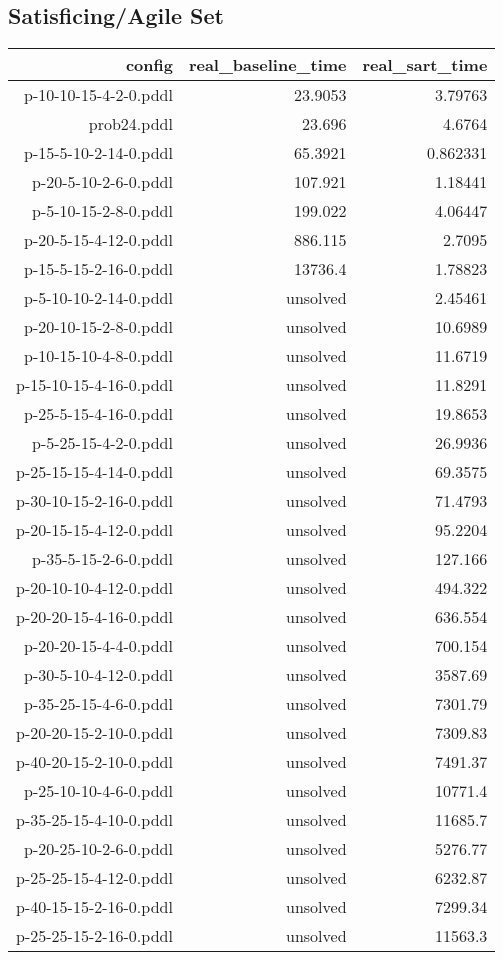 \documentclass{article}
\begin{document}
                    
                    \subsection*{Satisficing/Agile Set}
                    
                            \begin{center}
                            \scriptsize
                            \begin{tabular}{r|r|r}
                            config & real\_baseline\_time & real\_sart\_time\\\midrule
                             p-10-10-15-4-2-0.pddl&23.9053&3.79763\\
 prob24.pddl&23.696&4.6764\\
 p-15-5-10-2-14-0.pddl&65.3921&0.862331\\
 p-20-5-10-2-6-0.pddl&107.921&1.18441\\
 p-5-10-15-2-8-0.pddl&199.022&4.06447\\
 p-20-5-15-4-12-0.pddl&886.115&2.7095\\
 p-15-5-15-2-16-0.pddl&13736.4&1.78823\\
 p-5-10-10-2-14-0.pddl&unsolved&2.45461\\
 p-20-10-15-2-8-0.pddl&unsolved&10.6989\\
 p-10-15-10-4-8-0.pddl&unsolved&11.6719\\
 p-15-10-15-4-16-0.pddl&unsolved&11.8291\\
 p-25-5-15-4-16-0.pddl&unsolved&19.8653\\
 p-5-25-15-4-2-0.pddl&unsolved&26.9936\\
 p-25-15-15-4-14-0.pddl&unsolved&69.3575\\
 p-30-10-15-2-16-0.pddl&unsolved&71.4793\\
 p-20-15-15-4-12-0.pddl&unsolved&95.2204\\
 p-35-5-15-2-6-0.pddl&unsolved&127.166\\
 p-20-10-10-4-12-0.pddl&unsolved&494.322\\
 p-20-20-15-4-16-0.pddl&unsolved&636.554\\
 p-20-20-15-4-4-0.pddl&unsolved&700.154\\
 p-30-5-10-4-12-0.pddl&unsolved&3587.69\\
 p-35-25-15-4-6-0.pddl&unsolved&7301.79\\
 p-20-20-15-2-10-0.pddl&unsolved&7309.83\\
 p-40-20-15-2-10-0.pddl&unsolved&7491.37\\
 p-25-10-10-4-6-0.pddl&unsolved&10771.4\\
 p-35-25-15-4-10-0.pddl&unsolved&11685.7\\
 p-20-25-10-2-6-0.pddl&unsolved&5276.77\\
 p-25-25-15-4-12-0.pddl&unsolved&6232.87\\
 p-40-15-15-2-16-0.pddl&unsolved&7299.34\\
 p-25-25-15-2-16-0.pddl&unsolved&11563.3
                            \end{tabular}
                            \end{center}
                    
\end{document}
